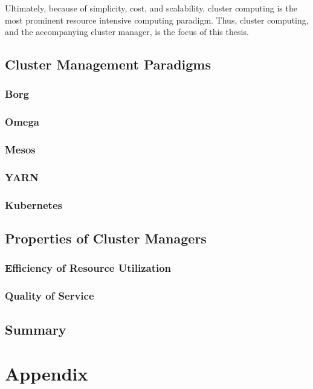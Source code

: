 \documentclass[twoside]{report}
\begin{document}
Ultimately, because of simplicity, cost, and scalability, cluster computing is
the most prominent resource intensive computing paradigm. Thus, cluster
computing, and the accompanying cluster manager, is the focus of this
thesis.

\section{Cluster Management Paradigms}

\subsection{Borg}

\subsection{Omega}

\subsection{Mesos}

\subsection{YARN}

\subsection{Kubernetes}

\section{Properties of Cluster Managers}

\subsection{Efficiency of Resource Utilization}

\subsection{Quality of Service}

\section{Summary}

\chapter{Appendix}
\end{document}
